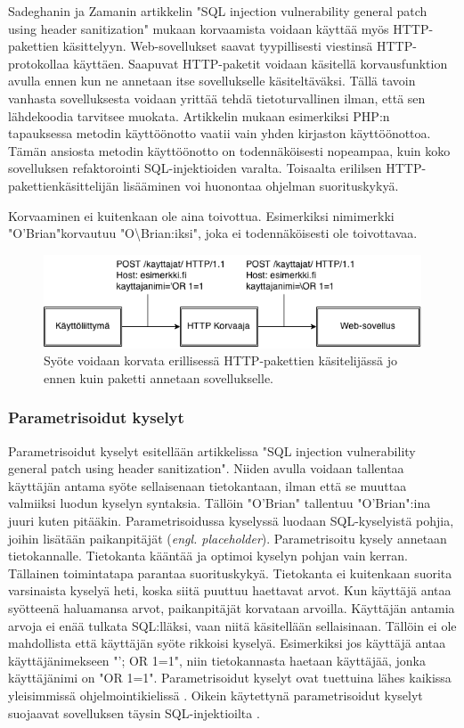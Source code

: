 \documentclass[finnish]{tktltiki2}
\theoremstyle{definition}
\theoremstyle{remark}
\begin{document}
		Sadeghanin ja Zamanin artikkelin "SQL injection vulnerability general patch using header sanitization"\space\cite{prepared} mukaan korvaamista voidaan käyttää myös HTTP-pakettien käsittelyyn. Web-sovellukset saavat tyypillisesti viestinsä HTTP-protokollaa käyttäen. Saapuvat HTTP-paketit voidaan käsitellä korvausfunktion avulla ennen kun ne annetaan itse sovellukselle käsiteltäväksi. Tällä tavoin vanhasta sovelluksesta voidaan yrittää tehdä tietoturvallinen ilman, että sen lähdekoodia tarvitsee muokata. Artikkelin mukaan esimerkiksi PHP:n tapauksessa metodin käyttöönotto vaatii vain yhden kirjaston käyttöönottoa. Tämän ansiosta metodin käyttöönotto on todennäköisesti nopeampaa, kuin koko sovelluksen refaktorointi SQL-injektioiden varalta. Toisaalta erililsen HTTP-pakettienkäsittelijän lisääminen voi huonontaa ohjelman suorituskykyä.
		
		Korvaaminen ei kuitenkaan ole aina toivottua. Esimerkiksi nimimerkki "O'Brian"\space korvautuu "O\textbackslash Brian:iksi", joka ei todennäköisesti ole toivottavaa. 
	
				\begin{figure}[h!]
					\caption{Syöte voidaan korvata erillisessä HTTP-pakettien käsitelijässä jo ennen kuin paketti annetaan sovellukselle. \cite{prepared}}
					
					
					\includegraphics[scale=0.6]{http}
				\end{figure}
		
		\subsubsection{Parametrisoidut kyselyt}
		Parametrisoidut kyselyt esitellään artikkelissa "SQL injection vulnerability general patch using header sanitization"\space \cite{prepared}. Niiden avulla voidaan tallentaa käyttäjän antama syöte sellaisenaan tietokantaan, ilman että se muuttaa valmiiksi luodun kyselyn syntaksia. Tällöin "O'Brian" tallentuu "O'Brian":ina juuri kuten pitääkin. Parametrisoidussa kyselyssä luodaan SQL-kyselyistä pohjia, joihin lisätään paikanpitäjät (\textit{engl. placeholder}). Parametrisoitu kysely annetaan tietokannalle. Tietokanta kääntää ja optimoi kyselyn pohjan vain kerran. Tällainen toimintatapa parantaa suorituskykyä. Tietokanta ei kuitenkaan suorita varsinaista kyselyä heti, koska siitä puuttuu haettavat arvot. Kun käyttäjä antaa syötteenä haluamansa arvot, paikanpitäjät korvataan arvoilla. Käyttäjän antamia arvoja ei enää tulkata SQL:lläksi, vaan niitä käsitellään sellaisinaan. Tällöin ei ole mahdollista että käyttäjän syöte rikkoisi kyselyä. Esimerkiksi jos käyttäjä antaa käyttäjänimekseen "'; OR 1=1", niin tietokannasta haetaan käyttäjää, jonka käyttäjänimi on "OR 1=1".
		Parametrisoidut kyselyt ovat tuettuina lähes kaikissa yleisimmissä ohjelmointikielissä \cite{java}. Oikein käytettynä parametrisoidut kyselyt suojaavat sovelluksen täysin SQL-injektioilta \cite{prepared}.
		
\end{document}
